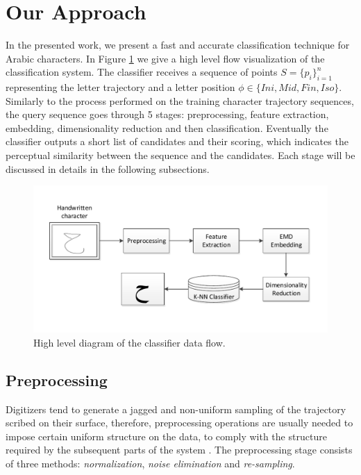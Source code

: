 \documentclass[10pt, conference, compsocconf]{IEEEtran}
\begin{document}
\section{Our Approach}
\label{sec:approach}
In the presented work, we present a fast and accurate classification technique for Arabic characters.
In Figure \ref{fig:letters_classifier_learning_flow} we give a high level flow visualization of the classification system.
The classifier receives a sequence of points $S=\{p_{i}\}_{i=1}^{n}$ representing the letter trajectory and a letter position $\phi \in \{Ini, Mid, Fin, Iso\}$.
Similarly to the process performed on the training character trajectory sequences, the query sequence goes through 5 stages: preprocessing, feature extraction, embedding, dimensionality reduction and then classification. 
Eventually the classifier outputs a short list of candidates and their scoring, which indicates the perceptual similarity between the sequence and the candidates. 
Each stage will be discussed in details in the following subsections.

\begin{figure}
\centering
\includegraphics[width=1\columnwidth]{./figures/letters_classifier_learning_flow2}       
\caption{High level diagram of the classifier data flow.}
\label{fig:letters_classifier_learning_flow}
\end{figure}
 
\subsection{Preprocessing}
Digitizers tend to generate a jagged and non-uniform sampling of the trajectory scribed on their surface, therefore, preprocessing operations are usually needed to impose certain uniform structure on the data, to comply with the structure required by the subsequent parts of the system \cite{al2011online}. 
The preprocessing stage consists of three methods: \emph{normalization}, \emph{noise elimination} and \emph{re-sampling}.
\end{document}
